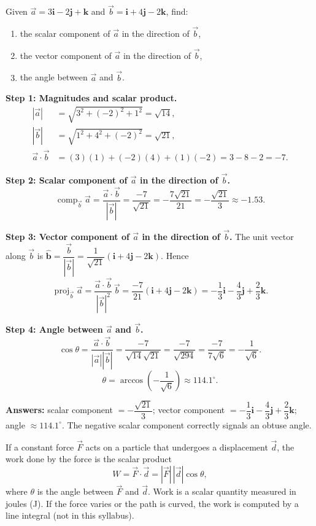 \documentclass[11pt]{article}
\newcommand{\cle}[1]{{\popxbold\color{popdark}#1}}
\begin{document}
\begin{exoresolu}
Given $\vec{a} = 3\mathbf{i} - 2\mathbf{j} + \mathbf{k}$ and $\vec{b} = \mathbf{i} + 4\mathbf{j} - 2\mathbf{k}$, find:
\begin{enumerate}
\item the scalar component of $\vec{a}$ in the direction of $\vec{b}$,
\item the vector component of $\vec{a}$ in the direction of $\vec{b}$,
\item the angle between $\vec{a}$ and $\vec{b}$.
\end{enumerate}
\tcblower
\textbf{Step 1: Magnitudes and scalar product.}
\begin{align*}
|\vec{a}| &= \sqrt{3^2 + (-2)^2 + 1^2} = \sqrt{14},\\
|\vec{b}| &= \sqrt{1^2 + 4^2 + (-2)^2} = \sqrt{21},\\
\vec{a}\cdot\vec{b} &= (3)(1) + (-2)(4) + (1)(-2) = 3 - 8 - 2 = -7.
\end{align*}

\textbf{Step 2: Scalar component of $\vec{a}$ in the direction of $\vec{b}$.}
\[
\operatorname{comp}_{\vec{b}}\vec{a} = \frac{\vec{a}\cdot\vec{b}}{|\vec{b}|} = \frac{-7}{\sqrt{21}} = -\frac{7\sqrt{21}}{21} = -\frac{\sqrt{21}}{3} \approx -1.53.
\]

\textbf{Step 3: Vector component of $\vec{a}$ in the direction of $\vec{b}$.}
The unit vector along $\vec{b}$ is $\hat{\mathbf{b}} = \dfrac{\vec{b}}{|\vec{b}|} = \dfrac{1}{\sqrt{21}}(\mathbf{i} + 4\mathbf{j} - 2\mathbf{k})$. Hence
\[
\operatorname{proj}_{\vec{b}}\vec{a} = \frac{\vec{a}\cdot\vec{b}}{|\vec{b}|^2}\,\vec{b} = \frac{-7}{21}(\mathbf{i} + 4\mathbf{j} - 2\mathbf{k}) = -\frac{1}{3}\mathbf{i} - \frac{4}{3}\mathbf{j} + \frac{2}{3}\mathbf{k}.
\]

\textbf{Step 4: Angle between $\vec{a}$ and $\vec{b}$.}
\[
\cos\theta = \frac{\vec{a}\cdot\vec{b}}{|\vec{a}||\vec{b}|} = \frac{-7}{\sqrt{14}\sqrt{21}} = \frac{-7}{\sqrt{294}} = \frac{-7}{7\sqrt{6}} = -\frac{1}{\sqrt{6}}.
\]
\[
\theta = \arccos\left(-\frac{1}{\sqrt{6}}\right) \approx 114.1^\circ.
\]

\textbf{Answers:} scalar component $= -\dfrac{\sqrt{21}}{3}$; vector component $= -\dfrac{1}{3}\mathbf{i} - \dfrac{4}{3}\mathbf{j} + \dfrac{2}{3}\mathbf{k}$; angle $\approx 114.1^\circ$. The negative scalar component correctly signals an obtuse angle.
\end{exoresolu}

\begin{definition}
If a constant force $\vec{F}$ acts on a particle that undergoes a displacement $\vec{d}$, the \cle{work done} by the force is the scalar product
\[
W = \vec{F}\cdot\vec{d} = |\vec{F}|\,|\vec{d}|\cos\theta,
\]
where $\theta$ is the angle between $\vec{F}$ and $\vec{d}$. Work is a scalar quantity measured in joules (J). If the force varies or the path is curved, the work is computed by a line integral (not in this syllabus).
\end{definition}
\end{document}
